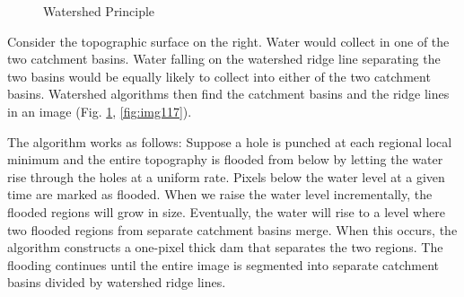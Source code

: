 \begin{figure}[htbp]
\centering
{}
\caption{ Watershed Principle}
\label{fig:WatershedPrinciple}
\end{figure} 

Consider the topographic surface on the right. Water would collect in
one of the two catchment basins. Water falling on the watershed ridge
line separating the two basins would be equally likely to collect into
either of the two catchment basins. Watershed algorithms then find the
catchment basins and the ridge lines in an image 
(Fig. \ref{fig:WatershedPrinciple}, \ref{fig:img117}).

The algorithm works as follows: Suppose a hole is punched at each
regional local minimum and the entire topography is flooded from below
by letting the water rise through the holes at a uniform rate. Pixels
below the water level at a given time are marked as flooded. When we
raise the water level incrementally, the flooded regions will grow in
size. Eventually, the water will rise to a level where two flooded
regions from separate catchment basins merge. When this occurs,
the algorithm constructs a one-pixel thick dam that separates the two
regions. The flooding continues until the entire image is segmented
into separate catchment basins divided by watershed ridge lines.

